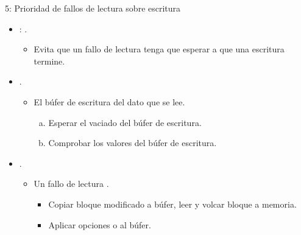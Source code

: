 \begin{frame}[t]{5: Prioridad de fallos de lectura sobre escritura}
\begin{itemize}
  \item {}: .
    \begin{itemize}
      \item Evita que un fallo de lectura tenga que esperar a que 
            una escritura termine.
    \end{itemize}

  \item {}.
    \begin{itemize}
      \item El búfer de escritura 
            del dato que se lee.
        \begin{enumerate}[a)]
          \item Esperar el vaciado del búfer de escritura.
          \item Comprobar los valores del búfer de escritura.
        \end{enumerate}
    \end{itemize}

  \item {}.
    \begin{itemize}
      \item Un fallo de lectura .
        \begin{itemize}
          \item Copiar bloque modificado a búfer, leer y volcar bloque a memoria.
          \item Aplicar opciones  o  al búfer.
        \end{itemize}
    \end{itemize}
\end{itemize}
\end{frame}

